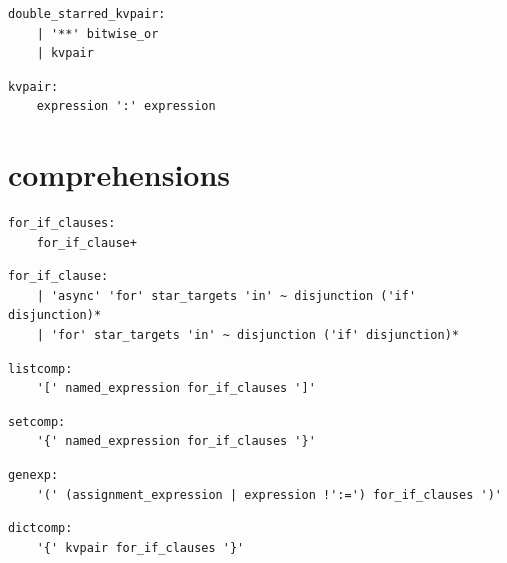 \noindent\textbf{\texttt{}}\par
\begin{lstlisting}
double_starred_kvpair:
    | '**' bitwise_or
    | kvpair
\end{lstlisting}

\noindent\textbf{\texttt{}}\par
\begin{lstlisting}
kvpair:
    expression ':' expression
\end{lstlisting}

\section{comprehensions}

\noindent\textbf{\texttt{}}\par
\begin{lstlisting}
for_if_clauses:
    for_if_clause+
\end{lstlisting}

\noindent\textbf{\texttt{}}\par
\begin{lstlisting}
for_if_clause:
    | 'async' 'for' star_targets 'in' ~ disjunction ('if' disjunction)*
    | 'for' star_targets 'in' ~ disjunction ('if' disjunction)*
\end{lstlisting}

\noindent\textbf{\texttt{}}\par
\begin{lstlisting}
listcomp:
    '[' named_expression for_if_clauses ']'
\end{lstlisting}

\noindent\textbf{\texttt{}}\par
\begin{lstlisting}
setcomp:
    '{' named_expression for_if_clauses '}'
\end{lstlisting}

\noindent\textbf{\texttt{}}\par
\begin{lstlisting}
genexp:
    '(' (assignment_expression | expression !':=') for_if_clauses ')'
\end{lstlisting}

\noindent\textbf{\texttt{}}\par
\begin{lstlisting}
dictcomp:
    '{' kvpair for_if_clauses '}'
\end{lstlisting}

